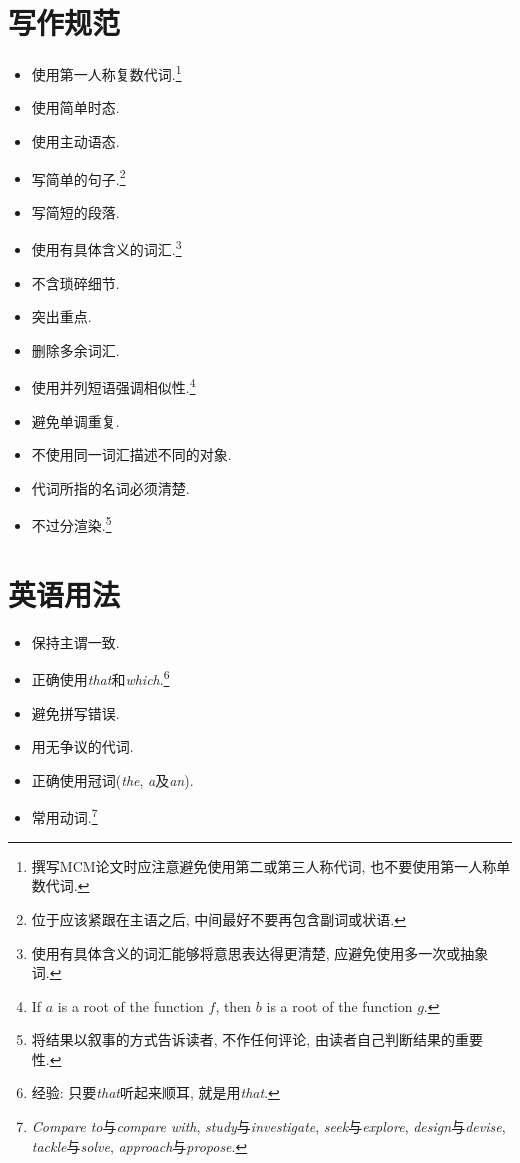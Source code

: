 \documentclass[openany]{ctexbook}
\begin{document}
    \section{写作规范}
    \begin{itemize}
        \item 使用第一人称复数代词.\footnote{撰写MCM论文时应注意避免使用第二或第三人称代词, 也不要使用第一人称单数代词.}
        \item 使用简单时态.
        \item 使用主动语态.
        \item 写简单的句子.\footnote{位于应该紧跟在主语之后, 中间最好不要再包含副词或状语.}
        \item 写简短的段落.
        \item 使用有具体含义的词汇.\footnote{使用有具体含义的词汇能够将意思表达得更清楚, 应避免使用多一次或抽象词.}
        \item 不含琐碎细节.
        \item 突出重点.
        \item 删除多余词汇.
        \item 使用并列短语强调相似性.\footnote{If $a$ is a root of the function $f$, then $b$ is a root of the function $g$.}
        \item 避免单调重复.
        \item 不使用同一词汇描述不同的对象.
        \item 代词所指的名词必须清楚.
        \item 不过分渲染.\footnote{将结果以叙事的方式告诉读者, 不作任何评论, 由读者自己判断结果的重要性.}
    \end{itemize}

    \section{英语用法}
    \begin{itemize}
        \item 保持主谓一致.
        \item 正确使用\emph{that}和\emph{which}.\footnote{经验: 只要\emph{that}听起来顺耳, 就是用\emph{that}.}
        \item 避免拼写错误.
        \item 用无争议的代词.
        \item 正确使用冠词(\emph{the}, \emph{a}及\emph{an}).
        \item 常用动词.\footnote{\emph{Compare to}与\emph{compare with}, \emph{study}与\emph{investigate}, \emph{seek}与\emph{explore}, \emph{design}与\emph{devise}, \emph{tackle}与\emph{solve}, \emph{approach}与\emph{propose}.}
    \end{itemize}
\end{document}
